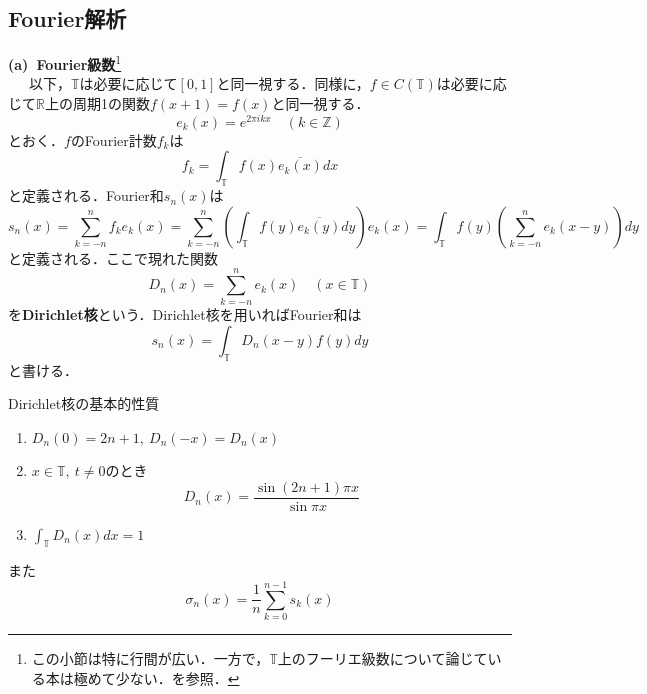 \documentclass[a4paper,11pt]{jsarticle}
\begin{document}
\subsection{Fourier解析}
%
%
{\bf (a){\ }Fourier級数}\footnote{この小節は特に行間が広い．一方で，$\mathbb{T}$上のフーリエ級数について論じている本は極めて少ない．\cite{takahashi}を参照．}\\
{\ }{\ }{\ }以下，$\mathbb{T}$は必要に応じて$[0,1]$と同一視する．同様に，$f\in C(\mathbb{T})$は必要に応じて$\mathbb{R}$上の周期1の関数$f(x+1)=f(x)$と同一視する．
\begin{equation*}
e_k(x)=e^{2\pi ikx} \quad (k\in\mathbb{Z})
\end{equation*}
とおく．$f$のFourier計数$f_k$は
\begin{equation*}
f_k=\int_\mathbb{T}f(x)\overline{e_k(x)}dx
\end{equation*}
と定義される．Fourier和$s_n(x)$は
\begin{equation*}
s_n(x)=\sum_{k=-n}^n f_ke_k(x)=\sum_{k=-n}^n\left(\int_\mathbb{T}f(y)\overline{e_k(y)}dy\right)e_k(x)=\int_\mathbb{T}f(y)\left(\sum_{k=-n}^ne_k(x-y)\right)dy
\end{equation*}
と定義される．ここで現れた関数
\begin{equation*}
D_n(x)=\sum_{k=-n}^ne_k(x) \quad (x\in\mathbb{T})
\end{equation*}
を{\bf Dirichlet核}という．Dirichlet核を用いればFourier和は
\begin{equation*}
s_n(x)=\int_\mathbb{T}D_n(x-y)f(y)dy
\end{equation*}
と書ける．
\begin{itembox}[l]{Dirichlet核の基本的性質}
\begin{enumerate}
\renewcommand{\labelenumi}{(\roman{enumi})}
\item $D_n(0)=2n+1,{\ }D_n(-x)=D_n(x)$
\item $x\in\mathbb{T},{\ }t\neq 0$のとき
\begin{equation*}
D_n(x)=\frac{\sin{(2n+1)\pi x}}{\sin{\pi x}}
\end{equation*}
\item $\int_\mathbb{T}D_n(x)dx=1$
\end{enumerate}
\end{itembox}
また
\begin{equation*}
\sigma_n(x)=\frac{1}{n}\sum_{k=0}^{n-1}s_k(x)
\end{equation*}
\end{document}
